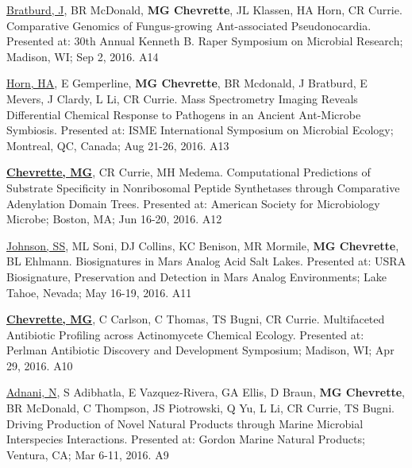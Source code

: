 \begin{cvpubs}
  \cvpub
    {\underline{Bratburd, J}, BR McDonald, \textbf{MG Chevrette}, JL Klassen, HA Horn, CR Currie.  Comparative Genomics of Fungus-growing Ant-associated Pseudonocardia.  Presented at: 30th Annual Kenneth B. Raper Symposium on Microbial Research; Madison, WI; Sep 2, 2016.} %
    {A14} %
    
  \cvpub
    {\underline{Horn, HA}, E Gemperline, \textbf{MG Chevrette}, BR Mcdonald, J Bratburd, E Mevers, J Clardy, L Li, CR Currie.  Mass Spectrometry Imaging Reveals Differential Chemical Response to Pathogens in an Ancient Ant-Microbe Symbiosis.  Presented at: ISME International Symposium on Microbial Ecology; Montreal, QC, Canada; Aug 21-26, 2016.} %
    {A13} %


  \cvpub
    {\textbf{\underline{Chevrette, MG}}, CR Currie, MH Medema.  Computational Predictions of Substrate Specificity in Nonribosomal Peptide Synthetases through Comparative Adenylation Domain Trees.  Presented at: American Society for Microbiology Microbe; Boston, MA; Jun 16-20, 2016.} %
    {A12} %
    
  \cvpub
    {\underline{Johnson, SS}, ML Soni, DJ Collins, KC Benison, MR Mormile, \textbf{MG Chevrette}, BL Ehlmann.  Biosignatures in Mars Analog Acid Salt Lakes.  Presented at: USRA Biosignature, Preservation and Detection in Mars Analog Environments; Lake Tahoe, Nevada; May 16-19, 2016.} %
    {A11} %

  \cvpub
    {\textbf{\underline{Chevrette, MG}}, C Carlson, C Thomas, TS Bugni, CR Currie.  Multifaceted Antibiotic Profiling across Actinomycete Chemical Ecology.  Presented at: Perlman Antibiotic Discovery and Development Symposium; Madison, WI; Apr 29, 2016.} %
    {A10} %

  \cvpub
    {\underline{Adnani, N}, S Adibhatla, E Vazquez-Rivera, GA Ellis, D Braun, \textbf{MG Chevrette}, BR McDonald, C Thompson, JS Piotrowski, Q Yu, L Li, CR Currie, TS Bugni.  Driving Production of Novel Natural Products through Marine Microbial Interspecies Interactions.  Presented at: Gordon Marine Natural Products; Ventura, CA; Mar 6-11, 2016.} %
    {A9} %
    

\end{cvpubs}
